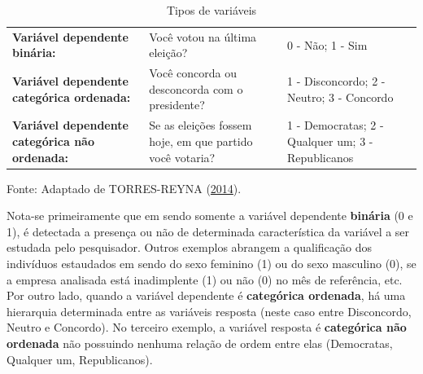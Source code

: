 \documentclass[12pt,brazil,]{book}
\begin{document}
\begin{longtable}[]{@{}lll@{}}
\caption{Tipos de variáveis}\tabularnewline
\toprule
\endhead
\begin{minipage}[t]{0.30\columnwidth}\raggedright
\textbf{Variável dependente binária:}\strut
\end{minipage} & \begin{minipage}[t]{0.30\columnwidth}\raggedright
Você votou na última eleição?\strut
\end{minipage} & \begin{minipage}[t]{0.30\columnwidth}\raggedright
0 - Não; 1 - Sim\strut
\end{minipage}\tabularnewline
\begin{minipage}[t]{0.30\columnwidth}\raggedright
\textbf{Variável dependente categórica ordenada:}\strut
\end{minipage} & \begin{minipage}[t]{0.30\columnwidth}\raggedright
Você concorda ou desconcorda com o presidente?\strut
\end{minipage} & \begin{minipage}[t]{0.30\columnwidth}\raggedright
1 - Disconcordo; 2 - Neutro; 3 - Concordo\strut
\end{minipage}\tabularnewline
\begin{minipage}[t]{0.30\columnwidth}\raggedright
\textbf{Variável dependente categórica não ordenada:}\strut
\end{minipage} & \begin{minipage}[t]{0.30\columnwidth}\raggedright
Se as eleições fossem hoje, em que partido você votaria?\strut
\end{minipage} & \begin{minipage}[t]{0.30\columnwidth}\raggedright
1 - Democratas; 2 - Qualquer um; 3 - Republicanos\strut
\end{minipage}\tabularnewline
\bottomrule
\end{longtable}

Fonte: Adaptado de TORRES-REYNA
(\protect\hyperlink{ref-Torres-Reyna2014}{2014}).

Nota-se primeiramente que em sendo somente a variável dependente
\textbf{binária} (0 e 1), é detectada a presença ou não de determinada
característica da variável a ser estudada pelo pesquisador. Outros
exemplos abrangem a qualificação dos indivíduos estaudados em sendo do
sexo feminino (1) ou do sexo masculino (0), se a empresa analisada está
inadimplente (1) ou não (0) no mês de referência, etc. Por outro lado,
quando a variável dependente é \textbf{categórica ordenada}, há uma
hierarquia determinada entre as variáveis resposta (neste caso entre
Disconcordo, Neutro e Concordo). No terceiro exemplo, a variável
resposta é \textbf{categórica não ordenada} não possuindo nenhuma
relação de ordem entre elas (Democratas, Qualquer um, Republicanos).
\end{document}
